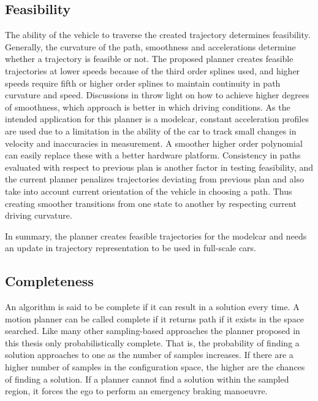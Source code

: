 \subsection{Feasibility}
\label{feasibility}
The ability of the vehicle to traverse the created trajectory determines feasibility. Generally, the curvature of the path, smoothness and accelerations determine whether a trajectory is feasible or not. The proposed planner creates feasible trajectories at lower speeds because of the third order splines used, and higher speeds require fifth or higher order splines to maintain continuity in path curvature and speed. Discussions in \cite{cmu_parallel_thesis} \cite{ppt_teqniqs_coll_Avdnce} throw light on how to achieve higher degrees of smoothness, which approach is better in which driving conditions. As the intended application for this planner is a modelcar, constant acceleration profiles are used due to a limitation in the ability of the car to track small changes in velocity and inaccuracies in measurement. A smoother higher order polynomial can easily replace these with a better hardware platform. Consistency in paths evaluated with respect to previous plan is another factor in testing feasibility, and the current planner penalizes trajectories deviating from previous plan and also take into account current orientation of the vehicle in choosing a path. Thus creating smoother transitions from one state to another by respecting current driving curvature.

In summary, the planner creates feasible trajectories for the modelcar and needs an update in trajectory representation to be used in full-scale cars. 

\subsection{Completeness}
\label{completeness}
An algorithm is said to be complete if it can result in a solution every time. A motion planner can be called complete if it returns path if it exists in the space searched. Like many other sampling-based approaches the planner proposed in this thesis only probabilistically complete. That is, the probability of finding a solution approaches to one as the number of samples increases. If there are a higher number of samples in the configuration space, the higher are the chances of finding a solution. If a planner cannot find a solution within the sampled region, it forces the ego to perform an emergency braking manoeuvre. 

